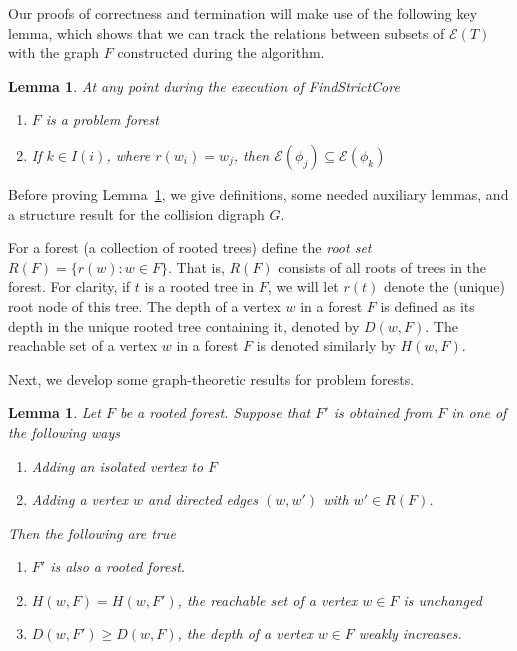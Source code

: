 \documentclass[11pt,reqno]{amsart}
\newtheorem{lemma}[thm]{Lemma}
\theoremstyle{definition}
\numberwithin{equation}{section}
\newcommand{\pre}{\phi}
\newcommand{\sub}{\subseteq}
\newcommand{\fix}{\mathcal{E}}
\newcommand{\coll}{I}
\newcommand{\reach}{H}
\newcommand{\forest}{F}
\newcommand{\roott}{R}
\newcommand{\depth}{D}
\begin{document}
Our proofs of correctness and termination will make use of the following key lemma, which shows that we can track the relations between subsets of $\fix(T)$ with the graph $F$ constructed during the algorithm.

\begin{lemma} \label{lemma:key}
At any point during the execution of FindStrictCore 
\begin{enumerate}
\item $\forest$ is a problem forest \label{convlemma:forest}
\item If $k \in \coll(i)$, where $r(w_i) = w_j$, then $\fix(\pre_j) \sub \fix(\pre_k)$ \label{convlemma:coll}
\end{enumerate}
\end{lemma}

Before proving Lemma~\ref{lemma:key}, we give definitions, some needed auxiliary lemmas, and a structure result for the collision digraph $G$. 

For a forest (a collection of rooted trees) define the \emph{root set} $\roott(\forest) = \{r(w): w\in F\}$. 
That is, $\roott(\forest)$ consists of all roots of trees in the forest.
For clarity, if $t$ is a rooted tree in $\forest$, we will let $r(t)$ denote the (unique) root node of this tree.
The depth of a vertex $w$ in a forest $\forest$ is defined as its depth in the unique rooted tree containing it, denoted by $\depth(w, \forest)$.
The reachable set of a vertex $w$ in a forest $\forest$ is denoted similarly by $\reach(w, \forest)$.

Next, we develop some graph-theoretic results for problem forests. 

\begin{lemma} \label{lemma:forest}
Let $\forest$ be a rooted forest. 
Suppose that $\forest'$ is obtained from $\forest$ in one of the following ways 
\begin{enumerate}
\item Adding an isolated vertex to $\forest$ \label{forest:solo}
\item Adding a vertex $w$ and directed edges $(w,w')$ with $w' \in \roott(\forest)$. \label{forest:child}
\end{enumerate}
Then the following are true  
\begin{enumerate}
\item[(i)] $\forest'$ is also a rooted forest. 
\item[(ii)] $\reach(w,\forest) = \reach(w,\forest')$, the reachable set of a vertex $w \in \forest$ is unchanged
\item[(iii)] $\depth(w,\forest') \geq \depth(w,\forest)$, the depth of a vertex $w \in \forest$ weakly increases.
\end{enumerate}

\end{lemma}
\end{document}
